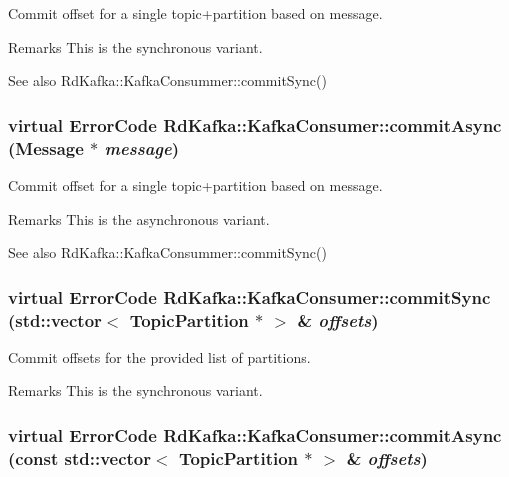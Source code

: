 Commit offset for a single topic+partition based on {\ttfamily message}. \begin{DoxyRemark}{Remarks}
This is the synchronous variant.
\end{DoxyRemark}
\begin{DoxySeeAlso}{See also}
RdKafka::KafkaConsummer::commitSync() 
\end{DoxySeeAlso}
\hypertarget{classRdKafka_1_1KafkaConsumer_a278db6d20ebcaf501af9487c0957d57f}{
\subsubsection[{commitAsync}]{\setlength{\rightskip}{0pt plus 5cm}virtual ErrorCode RdKafka::KafkaConsumer::commitAsync ({\bf Message} $\ast$ {\em message})}}
\label{classRdKafka_1_1KafkaConsumer_a278db6d20ebcaf501af9487c0957d57f}


Commit offset for a single topic+partition based on {\ttfamily message}. \begin{DoxyRemark}{Remarks}
This is the asynchronous variant.
\end{DoxyRemark}
\begin{DoxySeeAlso}{See also}
RdKafka::KafkaConsummer::commitSync() 
\end{DoxySeeAlso}
\hypertarget{classRdKafka_1_1KafkaConsumer_a892f5ec51f898b67a19d892b9ab08177}{
\subsubsection[{commitSync}]{\setlength{\rightskip}{0pt plus 5cm}virtual ErrorCode RdKafka::KafkaConsumer::commitSync (std::vector$<$ {\bf TopicPartition} $\ast$ $>$ \& {\em offsets})}}
\label{classRdKafka_1_1KafkaConsumer_a892f5ec51f898b67a19d892b9ab08177}


Commit offsets for the provided list of partitions. \begin{DoxyRemark}{Remarks}
This is the synchronous variant. 
\end{DoxyRemark}
\hypertarget{classRdKafka_1_1KafkaConsumer_a66a2c7639521e0c9eb25c3417921e318}{
\subsubsection[{commitAsync}]{\setlength{\rightskip}{0pt plus 5cm}virtual ErrorCode RdKafka::KafkaConsumer::commitAsync (const std::vector$<$ {\bf TopicPartition} $\ast$ $>$ \& {\em offsets})}}
\label{classRdKafka_1_1KafkaConsumer_a66a2c7639521e0c9eb25c3417921e318}


